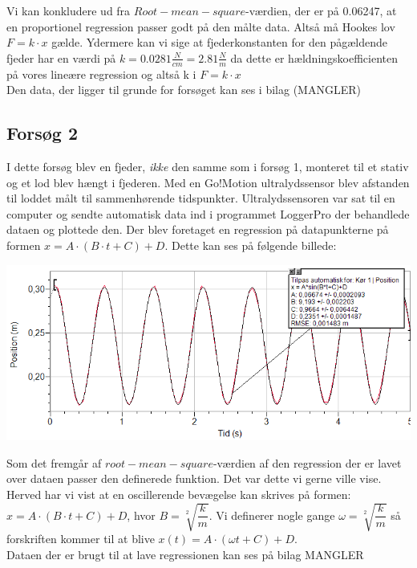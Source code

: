 Vi kan konkludere ud fra $Root-mean-square$-værdien, der er på 0.06247, at en proportionel regression passer godt på den målte data. Altså må Hookes lov $F=k \cdot x$ gælde. Ydermere kan vi sige at fjederkonstanten for den pågældende fjeder har en værdi på $k=0.0281\frac{N}{cm} = 2.81 \frac{N}{m}$ da dette er hældningskoefficienten på vores lineære regression og altså k i $F=k \cdot x$
\\

Den data, der ligger til grunde for forsøget kan ses i bilag (MANGLER) 
\\

\subsection{Forsøg 2}
I dette forsøg blev en fjeder, \emph{ikke} den samme som i forsøg 1, monteret til et stativ og et lod blev hængt i fjederen. Med en Go!Motion ultralydssensor blev afstanden til loddet målt til sammenhørende tidspunkter. Ultralydssensoren var sat til en computer og sendte automatisk data ind i programmet LoggerPro der behandlede dataen og plottede den. Der blev foretaget en regression på datapunkterne på formen $x = A \cdot (B \cdot t + C) + D$. Dette kan ses på følgende billede: 
\begin{center}
\includegraphics[scale=0.7]{Billeder/graf2}
\end{center}

Som det fremgår af $root-mean-square$-værdien af den regression der er lavet over dataen passer den definerede funktion. Det var dette vi gerne ville vise. Herved har vi vist at en oscillerende bevægelse kan skrives på formen: $x = A \cdot (B \cdot t + C) + D$, hvor $B=\sqrt[2]{\dfrac{k}{m}}$. Vi definerer nogle gange $\omega = \sqrt[2]{\dfrac{k}{m}}$ så forskriften kommer til at blive $x(t) = A \cdot (\omega t + C) + D$.
\\

Dataen der er brugt til at lave regressionen kan ses på bilag MANGLER
